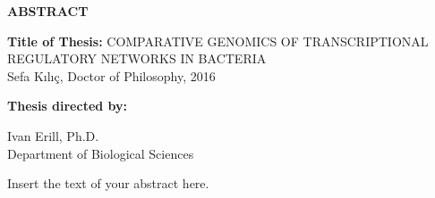 \newpage
\pagestyle{empty}

\begin{center}
\vspace{0.1in}
\large{\bf ABSTRACT} \par
\bigskip \bigskip
\end{center}

\begin{flushleft}
{\bf Title of Thesis:} COMPARATIVE GENOMICS OF TRANSCRIPTIONAL REGULATORY NETWORKS IN BACTERIA\\
Sefa Kılıç, Doctor of Philosophy, 2016 \\
\begin{singlespace}
{\bf Thesis directed by:}{\hspace{2.5mm}} \parbox[t]{3in}{Ivan Erill, Ph.D.\\
Department of Biological Sciences}
\end{singlespace}
\end{flushleft}

Insert the text of your abstract here.

\par\vfil

